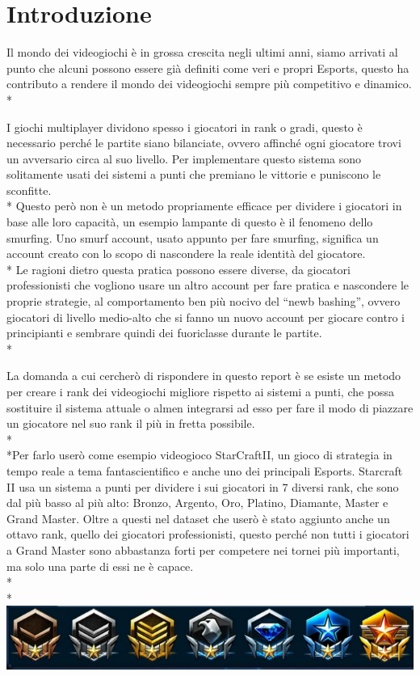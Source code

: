 \section{Introduzione}\label{sec:introduzione}
\normalsize
Il mondo dei videogiochi è in grossa crescita negli ultimi anni, siamo arrivati al punto che alcuni possono essere già definiti come veri e propri Esports, questo ha contributo a rendere il mondo dei videogiochi sempre più competitivo e dinamico. \\*\par
I giochi multiplayer dividono spesso i giocatori in rank o gradi, questo è necessario perché le partite siano bilanciate, ovvero affinché ogni giocatore trovi un avversario circa al suo livello. Per implementare questo sistema sono solitamente usati dei sistemi a punti che premiano le vittorie e puniscono le sconfitte. \\*
Questo però non è un metodo propriamente efficace per dividere i giocatori in base alle loro capacità, un esempio lampante di questo è il fenomeno dello smurfing. Uno smurf account, usato appunto per fare smurfing, significa un account creato con lo scopo di nascondere la reale identità del giocatore.\\*
Le ragioni dietro questa pratica possono essere diverse, da giocatori professionisti che vogliono usare un altro account per fare pratica e nascondere le proprie strategie, al comportamento ben più nocivo del “newb bashing”, ovvero giocatori di livello medio-alto che si fanno un nuovo account per giocare contro i principianti e sembrare quindi dei fuoriclasse durante le partite. \\*\par
La domanda a cui cercherò di rispondere in questo report è se esiste un metodo per creare i rank dei videogiochi migliore rispetto ai sistemi a punti, che possa sostituire il sistema attuale o almen integrarsi ad esso per fare il modo di piazzare un giocatore nel suo rank il più in fretta possibile.\\*\\*Per farlo userò come esempio videogioco StarCraftII, un gioco di strategia in tempo reale a tema fantascientifico e anche uno dei principali Esports. Starcraft II usa un sistema a punti per dividere i sui giocatori in 7 diversi rank, che sono dal più basso al più alto: Bronzo, Argento, Oro,  Platino, Diamante, Master e Grand Master. Oltre a questi nel dataset che userò è stato aggiunto anche un ottavo rank, quello dei giocatori professionisti, questo perché non tutti i giocatori a Grand Master sono abbastanza forti per competere nei tornei più importanti, ma solo una parte di essi ne è capace. \\*\\*
\includegraphics[scale=0.74]{../figures/ranks starcraft II.PNG} 

